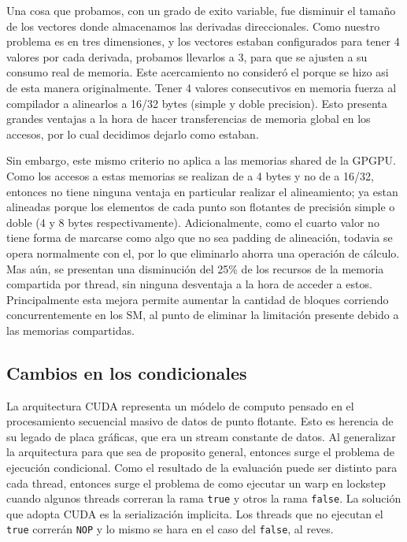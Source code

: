 Una cosa que probamos, con un grado de exito variable, fue disminuir el tama\~no de los vectores
donde almacenamos las derivadas direccionales. Como nuestro problema es en tres dimensiones,
y los vectores estaban configurados para tener 4 valores por cada derivada, probamos llevarlos a
3, para que se ajusten a su consumo real de memoria. Este acercamiento no consider\'o el porque
se hizo asi de esta manera originalmente. Tener 4 valores consecutivos en memoria fuerza
al compilador a alinearlos a 16/32 bytes (simple y doble precision).
Esto presenta grandes ventajas a la hora de hacer transferencias de memoria global en los accesos,
por lo cual decidimos dejarlo como estaban.

Sin embargo, este mismo criterio no aplica a las memorias shared de la GPGPU. Como los accesos
a estas memorias se realizan de a 4 bytes y no de a 16/32, entonces no tiene ninguna ventaja
en particular realizar el alineamiento; ya estan alineadas porque los elementos de cada punto
son flotantes de precisi\'on simple o doble (4 y 8 bytes respectivamente). Adicionalmente, como el
cuarto valor no tiene forma de marcarse como algo que no sea padding de alineaci\'on, todavia se
opera normalmente con el, por lo que eliminarlo ahorra una operaci\'on de c\'alculo. Mas a\'un,
se presentan una disminuci\'on del 25\% de los recursos de la memoria compartida por thread,
sin ninguna desventaja a la hora de acceder a estos. Principalmente esta mejora permite
aumentar la cantidad de bloques corriendo concurrentemente en los SM, al punto de eliminar
la limitaci\'on presente debido a las memorias compartidas.

\subsection{Cambios en los condicionales}
La arquitectura CUDA representa un m\'odelo de computo pensado en el procesamiento secuencial masivo
de datos de punto flotante. Esto es herencia de su legado de placa gr\'aficas, que era un stream
constante de datos. Al generalizar la arquitectura para que sea de proposito general, entonces
surge el problema de ejecuci\'on condicional. Como el resultado de la evaluaci\'on puede ser distinto
para cada thread, entonces surge el problema de como ejecutar un warp en lockstep cuando algunos threads
correran la rama \texttt{true} y otros la rama \texttt{false}. La soluci\'on que adopta CUDA es la
serializaci\'on implicita. Los threads que no ejecutan el \texttt{true} correr\'an \texttt{NOP}
y lo mismo se hara en el caso del \texttt{false}, al reves.

